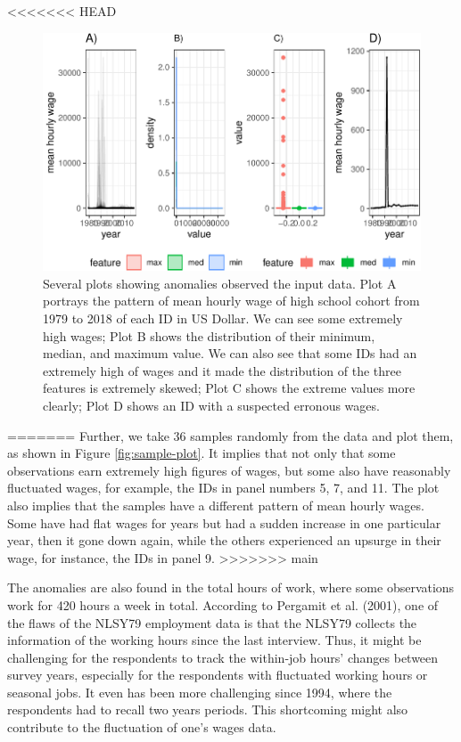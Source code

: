 \documentclass{article}
\begin{document}
<<<<<<< HEAD
\begin{figure}

{\centering \includegraphics[width=0.9\linewidth]{figures/feature-plot-1} 

}

\caption{Several plots showing anomalies observed the input data. Plot A portrays the pattern of mean hourly wage of high school cohort from 1979 to 2018 of each ID in US Dollar. We can see some extremely high wages; Plot B shows the distribution of their minimum, median, and maximum value. We can also see that some IDs had an extremely high of wages and it made the distribution of the three features is extremely skewed; Plot C shows the extreme values more clearly; Plot D shows an ID with a suspected erronous wages.}\label{fig:feature-plot}
\end{figure}
=======
Further, we take 36 samples randomly from the data and plot them, as shown in Figure \ref{fig:sample-plot}. It implies that not only that some observations earn extremely high figures of wages, but some also have reasonably fluctuated wages, for example, the IDs in panel numbers 5, 7, and 11. The plot also implies that the samples have a different pattern of mean hourly wages. Some have had flat wages for years but had a sudden increase in one particular year, then it gone down again, while the others experienced an upsurge in their wage, for instance, the IDs in panel 9.
>>>>>>> main

The anomalies are also found in the total hours of work, where some observations work for 420 hours a week in total. According to Pergamit et al. (2001), one of the flaws of the NLSY79 employment data is that the NLSY79 collects the information of the working hours since the last interview. Thus, it might be challenging for the respondents to track the within-job hours' changes between survey years, especially for the respondents with fluctuated working hours or seasonal jobs. It even has been more challenging since 1994, where the respondents had to recall two years periods. This shortcoming might also contribute to the fluctuation of one's wages data.
\end{document}
